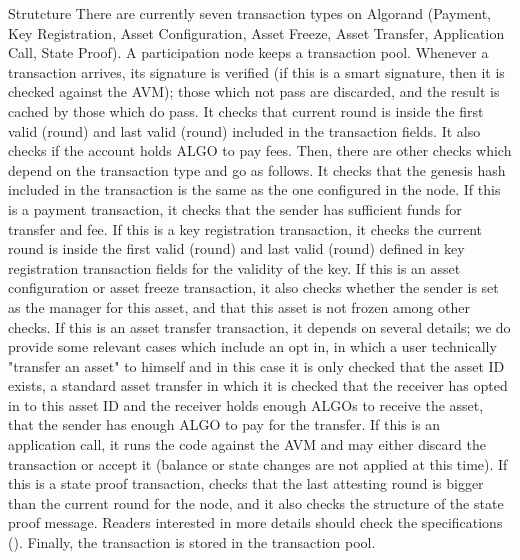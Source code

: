 \documentclass[10pt,a4paper]{article}
\begin{document}
\begin{section}{Strutcture}
There are currently seven transaction types on Algorand 
 (Payment, 
 Key Registration, 
 Asset Configuration, 
 Asset Freeze, 
 Asset Transfer, 
 Application Call, 
 State Proof).
A participation node keeps a transaction pool. 
Whenever a transaction arrives, 
  its signature is verified (if this is a smart signature, then it is checked against the AVM); those
    which not pass are discarded, and the result is cached by those which do pass.
  It checks that current round is inside the first valid (round) and last valid (round) included in the
    transaction fields.
  It also checks if the account holds ALGO to pay fees. Then, there are other checks which depend on the
    transaction type and go as follows.
  It checks that the genesis hash included in the transaction is the same as the one configured in the node.
  If this is a payment transaction, it checks that the sender has sufficient funds for transfer and fee.
  If this is a key  registration transaction, it checks the current round is inside the first valid (round) 
    and last valid (round) defined in key registration transaction fields for the validity of the key.
  If this is an asset configuration or asset freeze transaction, it also checks whether the sender is set 
    as the manager for this asset, and that this asset is not frozen among other checks.
  If this is an asset transfer transaction, it depends on several details; we do provide some relevant 
    cases which include an opt in, in which a user technically "transfer an asset" to himself and in this
    case it is only checked that the asset ID exists, 
    a standard asset transfer in which it is checked that the receiver has opted in to this asset ID and the 
    receiver holds enough ALGOs to receive the asset, that the sender has enough ALGO to pay for the transfer.
  If this is an application call, it runs the code against the AVM and may either discard the transaction or 
    accept it (balance or state changes are not applied at this time).
  If this is a state proof transaction, checks that the last attesting round is bigger than the current 
    round for the node, and it also checks the structure of the state proof message.
  Readers interested in more details should check the specifications (\cite{algorand:specs}).
  Finally, the transaction is stored in the transaction pool. 


\end{section}
\end{document}
